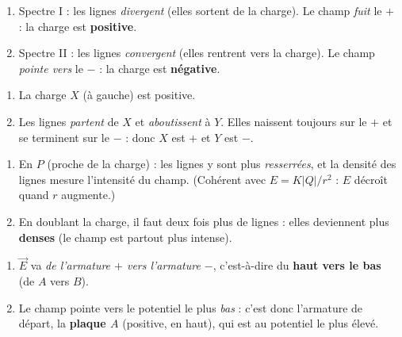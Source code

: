 \documentclass[11pt,a4paper]{article}
\newcommand{\vv}[1]{\vec{#1}}\newcommand{\ds}{\displaystyle}
\begin{document}

\begin{corrige}
\begin{enumerate}[label=\alph*)]
  \item Spectre I : les lignes \emph{divergent} (elles sortent de la charge). Le champ \emph{fuit}
        le $+$ : la charge est \textbf{positive}.
  \item Spectre II : les lignes \emph{convergent} (elles rentrent vers la charge). Le champ
        \emph{pointe vers} le $-$ : la charge est \textbf{négative}.
\end{enumerate}
\end{corrige}

\begin{corrige}
\begin{enumerate}[label=\alph*)]
  \item La charge \textbf{$X$} (à gauche) est positive.
  \item Les lignes \emph{partent} de $X$ et \emph{aboutissent} à $Y$. Elles naissent toujours sur
        le $+$ et se terminent sur le $-$ : donc $X$ est $+$ et $Y$ est $-$.
\end{enumerate}
\end{corrige}

\begin{corrige}
\begin{enumerate}[label=\alph*)]
  \item En $P$ (proche de la charge) : les lignes y sont plus \emph{resserrées}, et la densité des
        lignes mesure l'intensité du champ. (Cohérent avec $E = K|Q|/r^2$ : $E$ décroît quand $r$
        augmente.)
  \item En doublant la charge, il faut deux fois plus de lignes : elles deviennent plus
        \textbf{denses} (le champ est partout plus intense).
\end{enumerate}
\end{corrige}

\begin{corrige}
\begin{enumerate}[label=\alph*)]
  \item $\vv{E}$ va \emph{de l'armature $+$ vers l'armature $-$}, c'est-à-dire du \textbf{haut vers
        le bas} (de $A$ vers $B$).
  \item Le champ pointe vers le potentiel le plus \emph{bas} : c'est donc l'armature de départ, la
        \textbf{plaque $A$} (positive, en haut), qui est au potentiel le plus élevé.
\end{enumerate}
\end{corrige}
\end{document}
